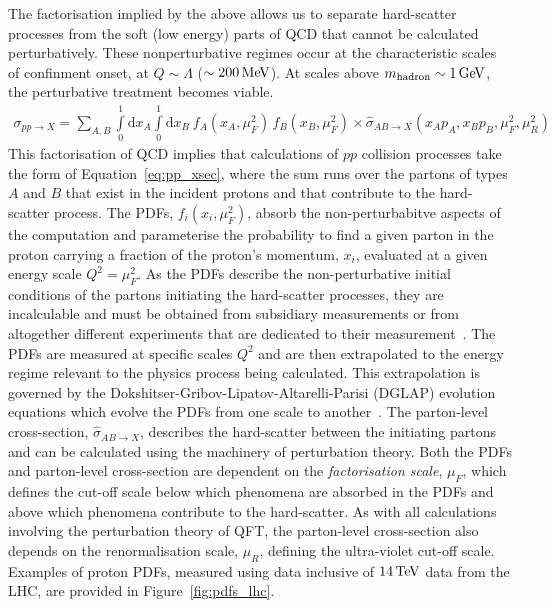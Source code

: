 The factorisation implied by the above allows us to separate hard-scatter processes from the soft (low energy) parts
of QCD that cannot be calculated perturbatively.
These nonperturbative regimes occur at the characteristic scales of confinment onset, at $Q \sim \Lambda$ ($\sim 200\,\text{Me\kern -0.1em V}$).
At scales above $m_{\text{hadron}} \sim 1\,\text{Ge\kern -0.1em V}$, the perturbative treatment becomes viable.
\begin{align}
    \sigma_{pp \rightarrow X} = \sum\limits_{A,B} \int\limits_0^1 \mathrm{d}x_A \int\limits_0^1 \mathrm{d}x_B \: f_{A}(x_A, \mu_F^2) \, f_{B}(x_B, \mu_F^2) \times \hat{\sigma}_{AB \rightarrow X}(x_A p_A, x_B p_B, \mu_F^2, \mu_R^2)
    \label{eq:pp_xsec}
\end{align}
This factorisation of QCD implies that calculations of $pp$ collision processes take the form of Equation~\ref{eq:pp_xsec},
where the sum runs over the partons of types $A$ and $B$ that exist in the incident protons and that contribute to the hard-scatter process.
The PDFs, $f_{i}(x_i, \mu_F^2)$, absorb the non-perturbabitve aspects of the computation and parameterise the probability
to find a given parton in the proton carrying a fraction of the proton's momentum, $x_i$, evaluated at a given energy scale
$Q^2 = \mu_F^2$.
As the PDFs describe the non-perturbative initial conditions of the partons initiating the hard-scatter processes,
they are incalculable and must be obtained from subsidiary measurements or from altogether
different experiments that are dedicated to their measurement~\cite{Placakyte:2011az,Ball:2012cx}.
The PDFs are measured at specific scales $Q^2$ and are then extrapolated to the energy regime relevant to the physics process
being calculated.
This extrapolation is governed by the Dokshitser-Gribov-Lipatov-Altarelli-Parisi (DGLAP)
evolution equations which evolve the PDFs from one scale to another~\cite{Altarelli:1977zs,Gribov:1972ri,Dokshitzer:1977sg}.
The parton-level cross-section, $\hat{\sigma}_{AB \rightarrow X}$, describes the hard-scatter between the initiating partons
and can be calculated using the machinery of perturbation theory.
Both the PDFs and parton-level cross-section are dependent on the \textit{factorisation scale}, $\mu_F$,
which defines the cut-off scale below which phenomena are absorbed in the PDFs and above which phenomena contribute to the
hard-scatter. 
As with all calculations involving the perturbation theory of QFT, the parton-level cross-section also depends on the
renormalisation scale, $\mu_R$, defining the ultra-violet cut-off scale.
Examples of proton PDFs, measured using data inclusive of $14\,\text{Te\kern -0.1em V}$ data from the LHC, are provided in Figure~\ref{fig:pdfs_lhc}.

